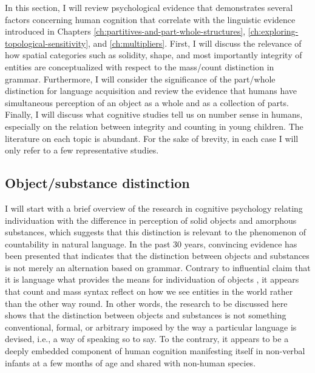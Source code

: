 In this section, I will review psychological evidence that demonstrates several factors concerning human cognition that correlate with the linguistic evidence introduced in Chapters \ref{ch:partitives-and-part-whole-structures}, \ref{ch:exploring-topological-sensitivity}, and \ref{ch:multipliers}. First, I will discuss the relevance of how spatial categories such as solidity, shape, and most importantly integrity of entities are conceptualized with respect to the mass/count distinction in grammar. Furthermore, I will consider the significance of the part/whole distinction for language acquisition and review the evidence that humans have simultaneous perception of an object as a whole and as a collection of parts. Finally, I will discuss what cognitive studies tell us on number sense in humans, especially on the relation between integrity and counting in young children. The literature on each topic is abundant. For the sake of brevity, in each case I will only refer to a few representative studies.

\subsection{Object/substance distinction}\label{sec:object-substance-distinction}

I will start with a brief overview of the research in cognitive psychology relating individuation with the difference in perception of solid objects and amorphous substances, which suggests that this distinction is relevant to the phenomenon of countability in natural language. In the past 30 years, convincing evidence has been presented that indicates that the distinction between objects and substances is not merely an alternation based on grammar. Contrary to  influential claim that it is language what provides the means for individuation of objects \citep[see also][]{pelletier_schubert1989mass}, it appears that count and mass syntax reflect on how we see entities in the world rather than the other way round. In other words, the research to be discussed here shows that the distinction between objects and substances is not something conventional, formal, or arbitrary imposed by the way a particular language is devised, i.e., a way of speaking so to say. To the contrary, it appears to be a deeply embedded component of human cognition manifesting itself in non-verbal infants at a few months of age and shared with non-human species. 

